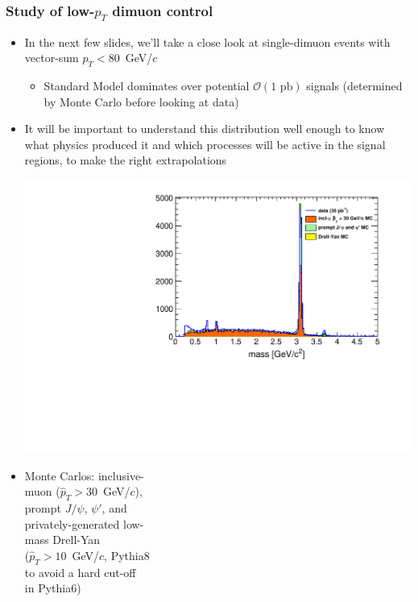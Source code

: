 \documentclass[compress]{beamer}
\begin{document}
\begin{frame}
\frametitle{Study of low-$p_T$ dimuon control}

\begin{itemize}
\item In the next few slides, we'll take a close look at single-dimuon events
  with vector-sum $p_T < 80$~GeV/$c$
\begin{itemize}
\item Standard Model dominates over potential $\mathcal{O}(\mbox{1 pb})$ signals (determined by Monte Carlo before looking at data)
\end{itemize}

\item It will be important to understand this distribution well enough
  to know what physics produced it and which processes will be active
  in the signal regions, to make the right extrapolations

\hfill \includegraphics[width=0.6\linewidth]{lowdimuon_massdistribution.pdf}

\vspace{-4.2 cm}
\item Monte Carlos: inclusive- \\ muon ($\hat{p}_T > 30$~GeV/$c$), \\ prompt $J/\psi$, $\psi'$, and \\ privately-generated low-\\ mass Drell-Yan \\ ($\hat{p}_T > 10$~GeV/$c$, Pythia8 \\ to avoid a hard cut-off \\ in Pythia6)
\end{itemize}
\end{frame}
\end{document}
